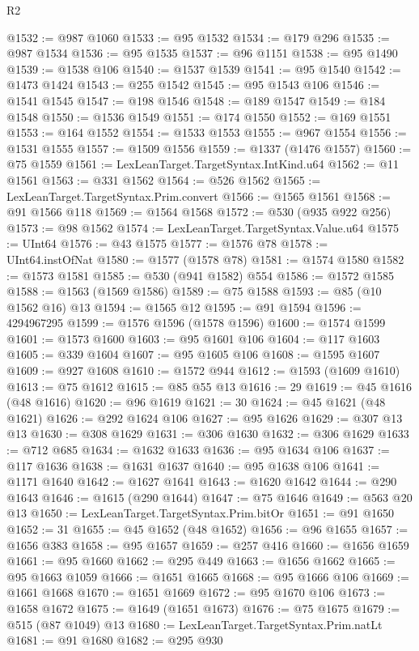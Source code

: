 \begin{lexlean}{R2}
\begin{coremodule}
@1532 := @987 @1060
@1533 := @95 @1532
@1534 := @179 @296
@1535 := @987 @1534
@1536 := @95 @1535
@1537 := @96 @1151
@1538 := @95 @1490
@1539 := @1538 @106
@1540 := @1537 @1539
@1541 := @95 @1540
@1542 := @1473 @1424
@1543 := @255 @1542
@1545 := @95 @1543 @106
@1546 := @1541 @1545
@1547 := @198 @1546
@1548 := @189 @1547
@1549 := @184 @1548
@1550 := @1536 @1549
@1551 := @174 @1550
@1552 := @169 @1551
@1553 := @164 @1552
@1554 := @1533 @1553
@1555 := @967 @1554
@1556 := @1531 @1555
@1557 := @1509 @1556
@1559 := @1337 (@1476 @1557)
@1560 := @75 @1559
@1561 := LexLeanTarget.TargetSyntax.IntKind.u64
@1562 := @11 @1561
@1563 := @331 @1562
@1564 := @526 @1562
@1565 := LexLeanTarget.TargetSyntax.Prim.convert
@1566 := @1565 @1561
@1568 := @91 @1566 @118
@1569 := @1564 @1568
@1572 := @530 (@935 @922 @256)
@1573 := @98 @1562
@1574 := LexLeanTarget.TargetSyntax.Value.u64
@1575 := UInt64
@1576 := @43 @1575
@1577 := @1576 @78
@1578 := UInt64.instOfNat
@1580 := @1577 (@1578 @78)
@1581 := @1574 @1580
@1582 := @1573 @1581
@1585 := @530 (@941 @1582) @554
@1586 := @1572 @1585
@1588 := @1563 (@1569 @1586)
@1589 := @75 @1588
@1593 := @85 (@10 @1562 @16) @13
@1594 := @1565 @12
@1595 := @91 @1594
@1596 := 4294967295
@1599 := @1576 @1596 (@1578 @1596)
@1600 := @1574 @1599
@1601 := @1573 @1600
@1603 := @95 @1601 @106
@1604 := @117 @1603
@1605 := @339 @1604
@1607 := @95 @1605 @106
@1608 := @1595 @1607
@1609 := @927 @1608
@1610 := @1572 @944
@1612 := @1593 (@1609 @1610)
@1613 := @75 @1612
@1615 := @85 @55 @13
@1616 := 29
@1619 := @45 @1616 (@48 @1616)
@1620 := @96 @1619
@1621 := 30
@1624 := @45 @1621 (@48 @1621)
@1626 := @292 @1624 @106
@1627 := @95 @1626
@1629 := @307 @13 @13
@1630 := @308 @1629
@1631 := @306 @1630
@1632 := @306 @1629
@1633 := @712 @685
@1634 := @1632 @1633
@1636 := @95 @1634 @106
@1637 := @117 @1636
@1638 := @1631 @1637
@1640 := @95 @1638 @106
@1641 := @1171 @1640
@1642 := @1627 @1641
@1643 := @1620 @1642
@1644 := @290 @1643
@1646 := @1615 (@290 @1644)
@1647 := @75 @1646
@1649 := @563 @20 @13
@1650 := LexLeanTarget.TargetSyntax.Prim.bitOr
@1651 := @91 @1650
@1652 := 31
@1655 := @45 @1652 (@48 @1652)
@1656 := @96 @1655
@1657 := @1656 @383
@1658 := @95 @1657
@1659 := @257 @416
@1660 := @1656 @1659
@1661 := @95 @1660
@1662 := @295 @449
@1663 := @1656 @1662
@1665 := @95 @1663 @1059
@1666 := @1651 @1665
@1668 := @95 @1666 @106
@1669 := @1661 @1668
@1670 := @1651 @1669
@1672 := @95 @1670 @106
@1673 := @1658 @1672
@1675 := @1649 (@1651 @1673)
@1676 := @75 @1675
@1679 := @515 (@87 @1049) @13
@1680 := LexLeanTarget.TargetSyntax.Prim.natLt
@1681 := @91 @1680
@1682 := @295 @930

\end{coremodule}
\end{lexlean}
